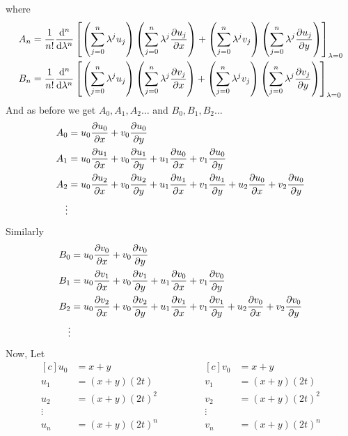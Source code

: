 \documentclass[]{article}
\begin{document}
where
\begin{align*}
    A_n &= \frac{1}{n!} \dv[n]{}{\lambda}\left[\left(\sum_{j=0}^{n} \lambda^j u_j\right)\left(\sum_{j=0}^{n} \lambda^j \pdv{u_j}{x}\right)+ \left(\sum_{j=0}^{n} \lambda^j v_j\right)\left(\sum_{j=0}^{n} \lambda^j \pdv{u_j}{y}\right)\right]_{\lambda=0}
    \\
    B_n &= \frac{1}{n!} \dv[n]{}{\lambda}\left[\left(\sum_{j=0}^{n} \lambda^j u_j\right)\left(\sum_{j=0}^{n} \lambda^j \pdv{v_j}{x}\right)+ \left(\sum_{j=0}^{n} \lambda^j v_j\right)\left(\sum_{j=0}^{n} \lambda^j \pdv{v_j}{y}\right)\right]_{\lambda=0}
\end{align*}
And as before we get $A_0,A_1,A_2\dots$ and $B_0,B_1,B_2\dots$
\begin{align*}
    A_0 &= u_0 \pdv{u_0}{x}+v_0 \pdv{u_0}{y}
    \\
    A_1 &= u_0 \pdv{u_1}{x} + v_0 \pdv{u_1}{y} + u_1 \pdv{u_0}{x} + v_1 \pdv{u_0}{y}
    \\
    A_2 &= u_0 \pdv{u_2}{x} + v_0 \pdv{u_2}{y} + u_1 \pdv{u_1}{x} + v_1 \pdv{u_1}{y} + u_2 \pdv{u_0}{x} + v_2 \pdv{u_0}{y} 
    \\
    \vdots
\end{align*}
\newpage
Similarly
\begin{align*}
    B_0 &= u_0 \pdv{v_0}{x}+v_0 \pdv{v_0}{y}
    \\
    B_1 &= u_0 \pdv{v_1}{x} + v_0 \pdv{v_1}{y} + u_1 \pdv{v_0}{x} + v_1 \pdv{v_0}{y}
    \\
   B_2 &= u_0 \pdv{v_2}{x} + v_0 \pdv{v_2}{y} + u_1 \pdv{v_1}{x} + v_1 \pdv{v_1}{y} + u_2 \pdv{v_0}{x} + v_2 \pdv{v_0}{y} 
    \\
    \vdots
\end{align*}
Now, Let 
\begin{equation*}
\begin{aligned}[c]
    u_0 &=  x+y
    \\
    u_1 &= (x+y)(2t)
    \\
    u_2 &= (x+y)(2t)^2
    \\
    \vdots
    \\
    u_n &= (x+y)(2t)^n
\end{aligned}
\qquad\qquad
\begin{aligned}[c]
    v_0 &=  x+y
    \\
    v_1 &= (x+y)(2t)
    \\
    v_2 &= (x+y)(2t)^2
    \\
    \vdots
    \\
    v_n &= (x+y)(2t)^n
\end{aligned}
\end{equation*}
\end{document}
